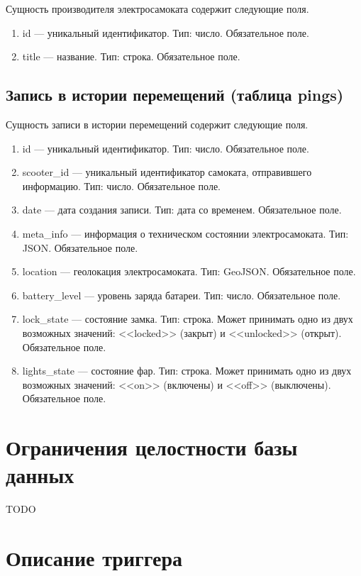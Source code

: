 Сущность производителя электросамоката содержит следующие поля.

\begin{enumerate}
    \item id --- уникальный идентификатор. Тип: число. Обязательное поле.
    \item title --- название. Тип: строка. Обязательное поле.
\end{enumerate}

\subsection{Запись в истории перемещений (таблица pings)}

Сущность записи в истории перемещений содержит следующие поля.

\begin{enumerate}
    \item id --- уникальный идентификатор. Тип: число. Обязательное поле.
    \item scooter\_id --- уникальный идентификатор самоката, отправившего информацию. Тип: число. Обязательное поле.
    \item date --- дата создания записи. Тип: дата со временем. Обязательное поле.
    \item meta\_info --- информация о техническом состоянии электросамоката. Тип: JSON. Обязательное поле.
    \item location --- геолокация электросамоката. Тип: GeoJSON. Обязательное поле.
    \item battery\_level --- уровень заряда батареи. Тип: число. Обязательное поле.
    \item lock\_state --- состояние замка. Тип: строка. Может принимать одно из двух возможных значений: <<locked>> (закрыт) и <<unlocked>> (открыт). Обязательное поле.
    \item lights\_state --- состояние фар. Тип: строка. Может принимать одно из двух возможных значений: <<on>> (включены) и <<off>> (выключены). Обязательное поле.
\end{enumerate}

\section{Ограничения целостности базы данных}

TODO

\section{Описание триггера}

